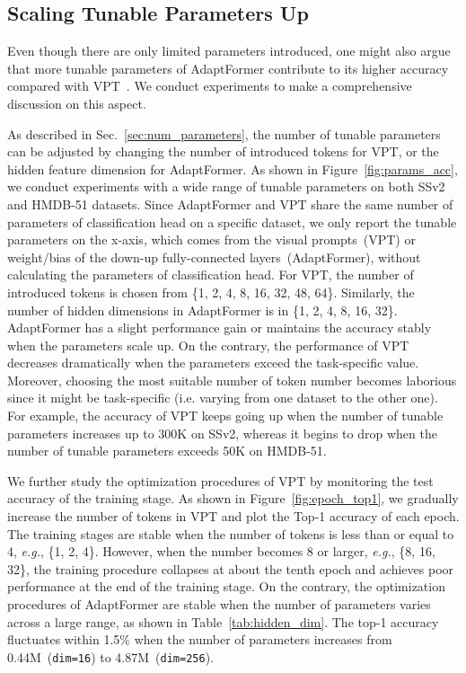 \subsection{Scaling Tunable Parameters Up} 

Even though there are only limited parameters introduced, one might also argue that more tunable parameters of AdaptFormer contribute to its higher accuracy compared with VPT~\cite{jia-2022-vpt}. We conduct experiments to make a comprehensive discussion on this aspect.

As described in Sec.~\ref{sec:num_parameters}, the number of tunable parameters can be adjusted by changing the number of introduced tokens for VPT, or the hidden feature dimension for AdaptFormer. As shown in Figure~\ref{fig:params_acc}, we conduct experiments with a wide range of tunable parameters on both \textcolor{Video}{SSv2} and \textcolor{Video}{HMDB-51} datasets. Since AdaptFormer and VPT share the same number of parameters of classification head on a specific dataset, we only report the tunable parameters on the x-axis, which comes from the visual prompts~(VPT) or weight/bias of the down-up fully-connected layers~(AdaptFormer), without calculating the parameters of classification head. For VPT, the number of introduced tokens is chosen from \{1, 2, 4, 8, 16, 32, 48, 64\}. Similarly, the number of hidden dimensions in AdaptFormer is in \{1, 2, 4, 8, 16, 32\}. AdaptFormer has a slight performance gain or maintains the accuracy stably when the parameters scale up. On the contrary, the performance of VPT decreases dramatically when the parameters exceed the task-specific value. Moreover, choosing the most suitable number of token number becomes laborious since it might be task-specific (i.e. varying from one dataset to the other one). For example, the accuracy of VPT keeps going up when the number of tunable parameters increases up to 300K on SSv2, whereas it begins to drop when the number of tunable parameters exceeds 50K on HMDB-51.

We further study the optimization procedures of VPT by monitoring the test accuracy of the training stage. As shown in Figure~\ref{fig:epoch_top1}, we gradually increase the number of tokens in VPT and plot the Top-1 accuracy of each epoch. The training stages are stable when the number of tokens is less than or equal to 4, \emph{e.g.}, \{1, 2, 4\}. However, when the number becomes 8 or larger, \emph{e.g.}, \{8, 16, 32\}, the training procedure collapses at about the tenth epoch and achieves poor performance at the end of the training stage. On the contrary, the optimization procedures of AdaptFormer are stable when the number of parameters varies across a large range, as shown in Table~\ref{tab:hidden_dim}. The top-1 accuracy fluctuates within 1.5\% when the number of parameters increases from 0.44M~(\texttt{dim=16}) to 4.87M~(\texttt{dim=256}).

